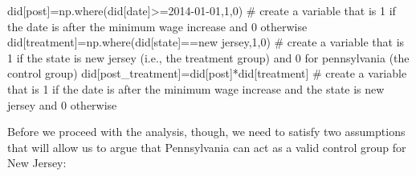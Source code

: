 \documentclass[
  letterpaper,
  DIV=11,
  numbers=noendperiod]{scrreprt}
\newenvironment{Shaded}{\begin{snugshade}}{\end{snugshade}}
\newcommand{\CommentTok}[1]{\textcolor[rgb]{0.37,0.37,0.37}{#1}}
\newcommand{\DecValTok}[1]{\textcolor[rgb]{0.68,0.00,0.00}{#1}}
\newcommand{\NormalTok}[1]{\textcolor[rgb]{0.00,0.23,0.31}{#1}}
\newcommand{\OperatorTok}[1]{\textcolor[rgb]{0.37,0.37,0.37}{#1}}
\newcommand{\StringTok}[1]{\textcolor[rgb]{0.13,0.47,0.30}{#1}}
\begin{document}
\begin{Shaded}
\begin{Highlighting}[]
\NormalTok{did[}\StringTok{\textquotesingle{}post\textquotesingle{}}\NormalTok{]}\OperatorTok{=}\NormalTok{np.where(did[}\StringTok{\textquotesingle{}date\textquotesingle{}}\NormalTok{]}\OperatorTok{\textgreater{}=}\StringTok{\textquotesingle{}2014{-}01{-}01\textquotesingle{}}\NormalTok{,}\DecValTok{1}\NormalTok{,}\DecValTok{0}\NormalTok{) }\CommentTok{\# create a variable that is 1 if the date is after the minimum wage increase and 0 otherwise}
\NormalTok{did[}\StringTok{\textquotesingle{}treatment\textquotesingle{}}\NormalTok{]}\OperatorTok{=}\NormalTok{np.where(did[}\StringTok{\textquotesingle{}state\textquotesingle{}}\NormalTok{]}\OperatorTok{==}\StringTok{\textquotesingle{}new jersey\textquotesingle{}}\NormalTok{,}\DecValTok{1}\NormalTok{,}\DecValTok{0}\NormalTok{) }\CommentTok{\# create a variable that is 1 if the state is new jersey (i.e., the treatment group) and 0 for pennsylvania (the control group)}
\NormalTok{did[}\StringTok{\textquotesingle{}post\_treatment\textquotesingle{}}\NormalTok{]}\OperatorTok{=}\NormalTok{did[}\StringTok{\textquotesingle{}post\textquotesingle{}}\NormalTok{]}\OperatorTok{*}\NormalTok{did[}\StringTok{\textquotesingle{}treatment\textquotesingle{}}\NormalTok{] }\CommentTok{\# create a variable that is 1 if the date is after the minimum wage increase and the state is new jersey and 0 otherwise}
\end{Highlighting}
\end{Shaded}

Before we proceed with the analysis, though, we need to satisfy two
assumptions that will allow us to argue that Pennsylvania can act as a
valid control group for New Jersey:
\end{document}

